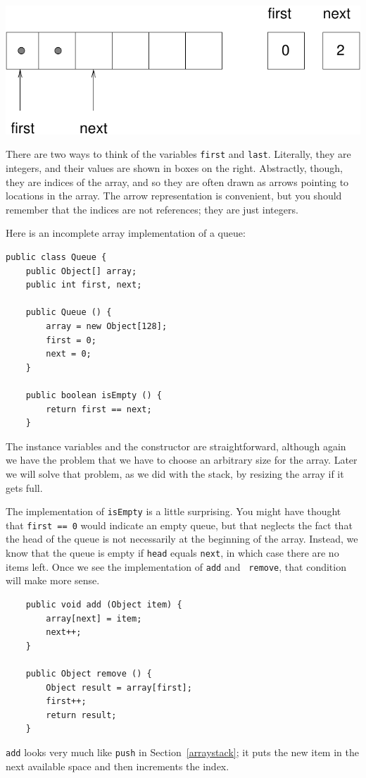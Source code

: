 \documentclass[12pt]{book}
\theoremstyle{exercise}
\begin{document}
\includegraphics{figs/queue2.pdf}

There are two ways to think of the variables {\tt first} and
{\tt last}.  Literally, they are integers, and their values are
shown in boxes on the right.  Abstractly, though, they are
indices of the array, and so they are often drawn as arrows
pointing to locations in the array.  The arrow representation is
convenient, but you should remember that the indices are not
references; they are just integers.

Here is an incomplete array implementation of a queue:

\begin{verbatim}
public class Queue {
    public Object[] array;
    public int first, next;

    public Queue () {
        array = new Object[128];
        first = 0;
        next = 0;
    }

    public boolean isEmpty () {
        return first == next;
    }
\end{verbatim}
%
The instance variables and the constructor are straightforward,
although again we have the problem that we have to choose an
arbitrary size for the array.  Later we will solve that problem,
as we did with the stack, by resizing the array if it gets full.

The implementation of {\tt isEmpty} is a little surprising.  You might
have thought that {\tt first == 0} would indicate an empty queue, but
that neglects the fact that the head of the queue is not necessarily
at the beginning of the array.  Instead, we know that the queue is
empty if {\tt head} equals {\tt next}, in which case there are no
items left.  Once we see the implementation of {\tt add} and {\tt
remove}, that condition will make more sense.

\begin{verbatim}
    public void add (Object item) {
        array[next] = item;
        next++;
    }

    public Object remove () {
        Object result = array[first];
        first++;
        return result;
    }
\end{verbatim}
%
{\tt add} looks very much like {\tt push} in Section~\ref{arraystack};
it puts the new item in the next available space and then increments
the index.
\end{document}
